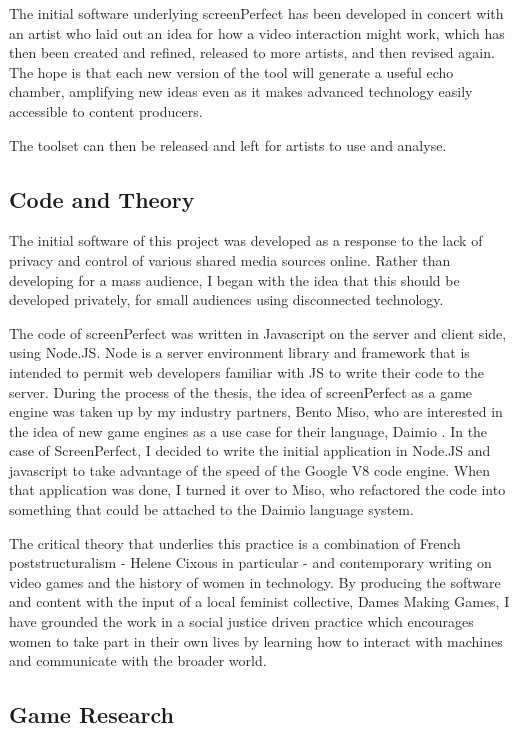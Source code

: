 The initial software underlying screenPerfect has been developed in concert with an artist who laid out an idea for how a video interaction might work, which has then been created and refined, released to more artists, and then revised again. The hope is that each new version of the tool will generate a useful echo chamber, amplifying new ideas even as it makes advanced technology easily accessible to content producers.

The toolset can then be released and left for artists to use and analyse.

\subsection{Code and Theory}

The initial software of this project was developed as a response to the lack of privacy and control of various shared media sources online. Rather than developing for a mass audience, I began with the idea that this should be developed privately, for small audiences using disconnected technology.

The code of screenPerfect was written in Javascript on the server and client side, using Node.JS. Node is a server environment library and framework that is intended to permit web developers familiar with JS to write their code to the server. During the process of the thesis, the idea of screenPerfect as a game engine was taken up by my industry partners, Bento Miso, who are interested in the idea of new game engines as a use case for their language, Daimio \cite{daimio}. In the case of ScreenPerfect, I decided to write the initial application in Node.JS and javascript to take advantage of the speed of the Google V8 code engine. When that application was done, I turned it over to Miso, who refactored the code into something that could be attached to the Daimio language system.

The critical theory that underlies this practice is a combination of French poststructuralism - Helene Cixous in particular - and contemporary writing on video games and the history of women in technology. By producing the software and content with the input of a local feminist collective, Dames Making Games, I have grounded the work in a social justice driven practice which encourages women to take part in their own lives by learning how to interact with machines and communicate with the broader world.


\subsection{Game Research}

